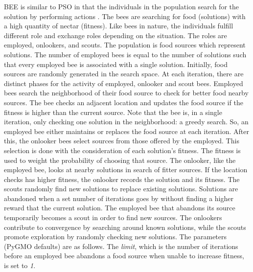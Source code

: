 \documentclass{tamuccthesis}
\begin{document}
BEE is similar to PSO in that the individuals in the population search for the solution by performing actions \cite{bee_ga:carballo:2017}. The bees are searching for food (solutions) with a high quantity of nectar (fitness). Like bees in nature, the individuals fulfill different role and exchange roles depending on the situation. The roles are employed, onlookers, and scouts. The population is food sources which represent solutions. The number of employed bees is equal to the number of solutions such that every employed bee is associated with a single solution. Initially, food sources are randomly generated in the search space. At each iteration, there are distinct phases for the activity of employed, onlooker and scout bees. Employed bees search the neighborhood of their food source to check for better food nearby sources. The bee checks an adjacent location and updates the food source if the fitness is higher than the current source. Note that the bee is, in a single iteration, only checking one solution in the neighborhood: a greedy search. So, an employed bee either maintains or replaces the food source at each iteration. After this, the onlooker bees select sources from those offered by the employed. This selection is done with the consideration of each solution's fitness. The fitness is used to weight the probability of choosing that source. The onlooker, like the employed bee, looks at nearby solutions in search of fitter sources. If the location checks has higher fitness, the onlooker records the solution and its fitness. The scouts randomly find new solutions to replace existing solutions. Solutions are abandoned when a set number of iterations goes by without finding a higher reward that the current solution. The employed bee that abandons its source temporarily becomes a scout in order to find new sources. The onlookers contribute to convergence by searching around known solutions, while the scouts promote exploration by randomly checking new solutions.  The parameters (PyGMO defaults) are as follows. The \textit{limit}, which is the number of iterations before an employed bee abandons a food source when unable to increase fitness, is set to \textit{1}. 
\end{document}
